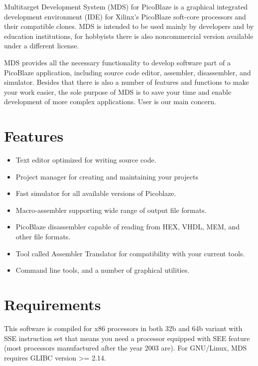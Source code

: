 Multitarget Development System (MDS) for PicoBlaze is a graphical integrated development environment (IDE) for Xilinx's PicoBlaze soft-core processors and their compatible clones. MDS is intended to be used mainly by developers and by education institutions, for hobbyists there is also noncommercial version available under a different license.

MDS provides all the necessary functionality to develop software part of a PicoBlaze application, including source code editor, assembler, disassembler, and simulator. Besides that there is also a number of features and functions to make your work easier, the sole purpose of MDS is to save your time and enable development of more complex applications. User is our main concern.

\section{Features}
    \begin{itemize}
        \item Text editor optimized for writing source code.
        \item Project manager for creating and maintaining your projects
        \item Fast simulator for all available versions of Picoblaze.
        \item Macro-assembler supporting wide range of output file formats.
        \item PicoBlaze disassembler capable of reading from HEX, VHDL, MEM, and other file formats.
        \item Tool called Assembler Translator for compatibility with your current tools.
        \item Command line tools, and a number of graphical utilities.
    \end{itemize}

\section{Requirements}
    This software is compiled for x86 processors in both 32b and 64b variant with SSE instruction set that means you
    need a processor equipped with SEE feature (most processors manufactured after the year 2003 are). For GNU/Linux,
    MDS requires GLIBC version >= 2.14.

